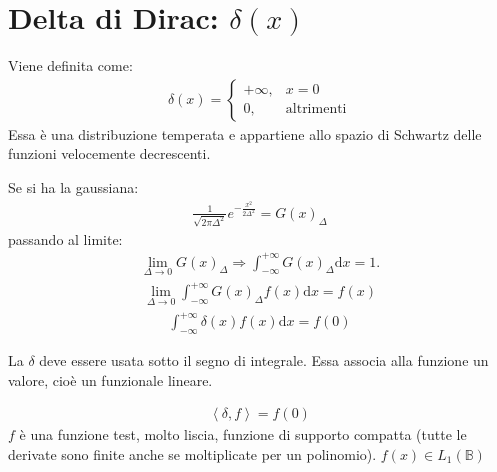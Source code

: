 \section{Delta di Dirac: $\delta \left(x\right)$} %
Viene definita come:
\begin{equation}\begin{split}
\delta \left(x\right)=\begin{cases}
+\infty , & x=0 \\
0, & \textrm{altrimenti}
\end{cases}
\end{split}\end{equation}
Essa è una distribuzione temperata e appartiene allo spazio di Schwartz delle funzioni velocemente decrescenti.

Se si ha la gaussiana:
\begin{equation}\begin{split}
\frac{1}{\sqrt{2\pi \Delta^2}}e^{-\frac{x^2}{2\Delta^2}}=G\left(x\right)_{\Delta}
\end{split}\end{equation}
passando al limite:
\begin{equation}\begin{split}
\lim_{\Delta\to 0}{G\left(x\right)}_{\Delta} \Longrightarrow \int_{-\infty }^{+\infty }{G\left(x\right)_{\Delta} \textrm{d}x}=1.
\end{split}\end{equation}
\begin{equation}\begin{split}
\lim_{\Delta\to 0}{\int_{-\infty }^{+\infty }{G\left(x\right)_{\Delta}f\left(x\right) \textrm{d}x}}=f\left(x\right)
\end{split}\end{equation}
\begin{equation}\begin{split}
\int_{-\infty }^{+\infty }{\delta \left(x\right)f\left(x\right) \textrm{d}x}=f\left(0\right)
\end{split}\end{equation}

La $\delta$ deve essere usata sotto il segno di integrale. Essa associa alla funzione un valore, cioè un funzionale lineare.

\begin{equation}\begin{split}
\left\langle \delta, f \right\rangle =f\left(0\right)
\end{split}\end{equation}
$f$ è una funzione test, molto liscia, funzione di supporto compatta (tutte le derivate sono finite anche se moltiplicate per un polinomio). $f(x)\in L _1(\mathbb{B})$

